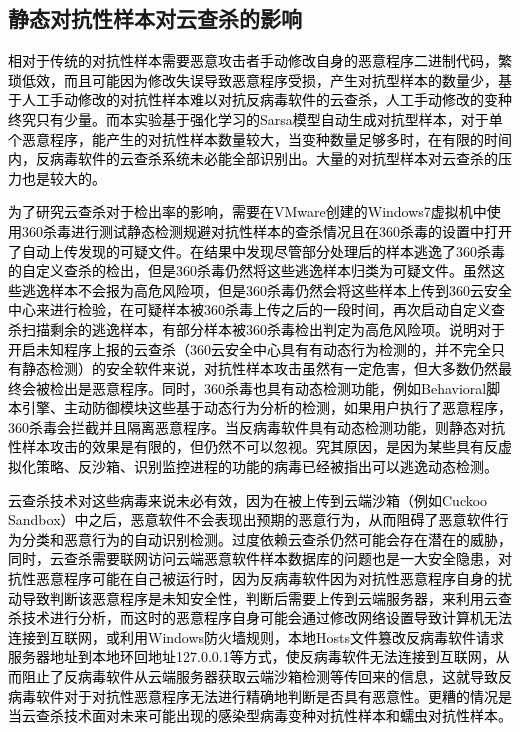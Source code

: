 \subsection{静态对抗性样本对云查杀的影响}

\textcolor{black}{相对于传统的对抗性样本需要恶意攻击者手动修改自身的恶意程序二进制代码，繁琐低效，而且可能因为修改失误导致恶意程序受损，产生对抗型样本的数量少，基于人工手动修改的对抗性样本难以对抗反病毒软件的云查杀，人工手动修改的变种终究只有少量。而本实验基于强化学习的Sarsa模型自动生成对抗型样本，对于单个恶意程序，能产生的对抗性样本数量较大，当变种数量足够多时，在有限的时间内，反病毒软件的云查杀系统未必能全部识别出。大量的对抗型样本对云查杀的压力也是较大的。}

\textcolor{black}{为了研究云查杀对于检出率的影响，需要在VMware创建的Windows7虚拟机中使用360杀毒进行测试静态检测规避对抗性样本的查杀情况且在360杀毒的设置中打开了自动上传发现的可疑文件。在结果中发现尽管部分处理后的样本逃逸了360杀毒的自定义查杀的检出，但是360杀毒仍然将这些逃逸样本归类为可疑文件。虽然这些逃逸样本不会报为高危风险项，但是360杀毒仍然会将这些样本上传到360云安全中心来进行检验，在可疑样本被360杀毒上传之后的一段时间，再次启动自定义查杀扫描剩余的逃逸样本，有部分样本被360杀毒检出判定为高危风险项。说明对于开启未知程序上报的云查杀（360云安全中心具有有动态行为检测的，并不完全只有静态检测）的安全软件来说，对抗性样本攻击虽然有一定危害，但大多数仍然最终会被检出是恶意程序。同时，360杀毒也具有动态检测功能，例如Behavioral脚本引擎、主动防御模块这些基于动态行为分析的检测，如果用户执行了恶意程序，360杀毒会拦截并且隔离恶意程序。当反病毒软件具有动态检测功能，则静态对抗性样本攻击的效果是有限的，但仍然不可以忽视。究其原因，是因为某些具有反虚拟化策略、反沙箱、识别监控进程的功能的病毒已经被指出可以逃逸动态检测。\cite{ref33}\cite{ref34}\cite{ref35}\cite{ref36}}

\textcolor{black}{云查杀技术对这些病毒来说未必有效，因为在被上传到云端沙箱（例如Cuckoo Sandbox）中之后，恶意软件不会表现出预期的恶意行为，从而阻碍了恶意软件行为分类和恶意行为的自动识别检测。过度依赖云查杀仍然可能会存在潜在的威胁，同时，云查杀需要联网访问云端恶意软件样本数据库的问题也是一大安全隐患，对抗性恶意程序可能在自己被运行时，因为反病毒软件因为对抗性恶意程序自身的扰动导致判断该恶意程序是未知安全性，判断后需要上传到云端服务器，来利用云查杀技术进行分析，而这时的恶意程序自身可能会通过修改网络设置导致计算机无法连接到互联网，或利用Windows防火墙规则，本地Hosts文件篡改反病毒软件请求服务器地址到本地环回地址127.0.0.1等方式，使反病毒软件无法连接到互联网，从而阻止了反病毒软件从云端服务器获取云端沙箱检测等传回来的信息，这就导致反病毒软件对于对抗性恶意程序无法进行精确地判断是否具有恶意性。更糟的情况是当云查杀技术面对未来可能出现的感染型病毒变种对抗性样本和蠕虫对抗性样本。}

